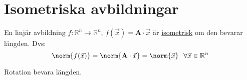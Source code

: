 \section{Isometriska avbildningar} %
\label{sec:isometriska_avbildningar}
\begin{Def}
	En linjär avbildning $f:\mathbb{R}^n \rightarrow \mathbb{R}^n$, $f(\vec{x}) = \mathbf{A} \cdot \vec{x}$ är \underline{isometrisk} om den bevarar längden. Dvs:
	\[
	\norm{f(\vec{x})} = \norm{\mathbf{A} \cdot \vec{x}} = \norm{\vec{x}} \text{\hspace{7pt}} \forall \vec{x} \in \mathbb{R}^n
	\]
\end{Def}

\begin{Ex}
	Rotation bevara längden.
\end{Ex}

